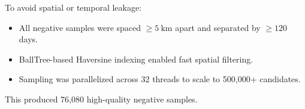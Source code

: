 \documentclass[conference]{IEEEtran}
\begin{document}
To avoid spatial or temporal leakage:

\begin{itemize}
    \item All negative samples were spaced \(\geq 5~\mathrm{km}\) apart and separated by \(\geq 120\) days.
    \item BallTree-based Haversine indexing enabled fast spatial filtering.
    \item Sampling was parallelized across 32 threads to scale to 500,000+ candidates.
\end{itemize}

This produced 76,080 high-quality negative samples.




\end{document}
